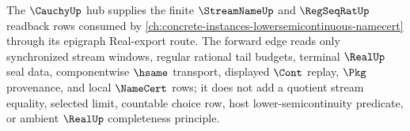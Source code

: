 The $\CauchyUp$ hub supplies the finite $\StreamNameUp$ and $\RegSeqRatUp$ readback rows consumed by \autoref{ch:concrete-instances-lowersemicontinuous-namecert} through its epigraph Real-export route. The forward edge reads only synchronized stream windows, regular rational tail budgets, terminal $\RealUp$ seal data, componentwise $\hsame$ transport, displayed $\Cont$ replay, $\Pkg$ provenance, and local $\NameCert$ rows; it does not add a quotient stream equality, selected limit, countable choice row, host lower-semicontinuity predicate, or ambient $\RealUp$ completeness principle.
